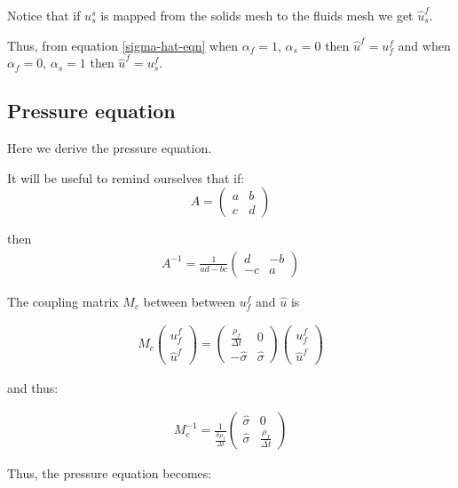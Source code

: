 Notice that if $u_s^s$ is mapped from the solids mesh to
the fluids mesh we get $\hat u_s^f$.

Thus, from equation \ref{sigma-hat-eqn} when $\alpha_f=1$, $\alpha_s=0$
then $\hat u^f=u_f^f$ and when $\alpha_f=0$,
$\alpha_s=1$ then $\hat u^f=u_s^f$.


\subsection{Pressure equation}
Here we derive the pressure equation.

It will be useful to remind ourselves that if:
\begin{equation}
A=
\begin{pmatrix}
 a & b \\ c & d
\end{pmatrix}
\end{equation}

then
\begin{eqnarray}
A^{-1} =\frac{1}{ad-bc}
\begin{pmatrix}
  d & -b \\ -c & a
\end{pmatrix}
\end{eqnarray}

The coupling matrix $M_c$ between between $u_f^f$ and $\hat u$ is

\begin{eqnarray}
M_c
\begin{pmatrix}
u_f^f \\ \hat u^f
\end{pmatrix}
=
\begin{pmatrix}
\frac{\rho_f}{\Delta t}  & 0 \\
-\hat\sigma  &\hat\sigma
\end{pmatrix}
\begin{pmatrix}
u_f^f \\ \hat u^f
\end{pmatrix}
\end{eqnarray}

and thus:

\begin{eqnarray}
M_c^{-1}=\frac{1}{ \frac{\hat\sigma\rho_f}{\Delta t}}
\begin{pmatrix}
\hat\sigma  & 0 \\
 \hat\sigma  & \frac{\rho_f}{\Delta t}
\end{pmatrix}
\end{eqnarray}

Thus, the pressure equation becomes:

